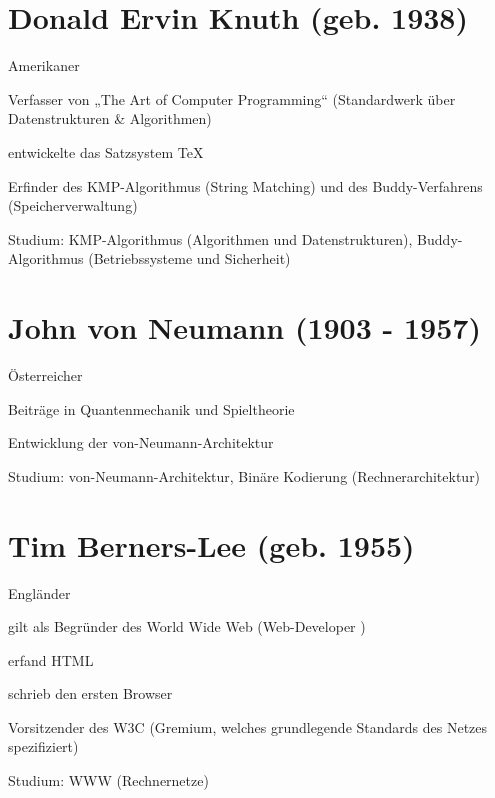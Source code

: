 \documentclass[a4paper,12pt]{report}
\begin{document}
\section*{Donald Ervin Knuth (geb. 1938)}
\begin{itemize*}
    \item Amerikaner
    \item Verfasser von „The Art of Computer Programming“ (Standardwerk über Datenstrukturen \&
          Algorithmen)
    \item entwickelte das Satzsystem TeX
    \item Erfinder des KMP-Algorithmus (String Matching) und des Buddy-Verfahrens
          (Speicherverwaltung)
    \item Studium: KMP-Algorithmus (Algorithmen und Datenstrukturen), Buddy-Algorithmus
          (Betriebssysteme und Sicherheit)
\end{itemize*}

\section*{John von Neumann (1903 - 1957)}
\begin{itemize*}
    \item Österreicher
    \item Beiträge in Quantenmechanik und Spieltheorie
    \item Entwicklung der von-Neumann-Architektur
    \item Studium: von-Neumann-Architektur, Binäre Kodierung (Rechnerarchitektur)
\end{itemize*}

\section*{Tim Berners-Lee (geb. 1955)}
\begin{itemize*}
    \item Engländer
    \item gilt als Begründer des World Wide Web (Web-Developer \Laughey)
    \item erfand HTML
    \item schrieb den ersten Browser
    \item Vorsitzender des W3C (Gremium, welches grundlegende Standards des Netzes
          spezifiziert)
    \item Studium: WWW (Rechnernetze)
\end{itemize*}

\newpage
\end{document}
